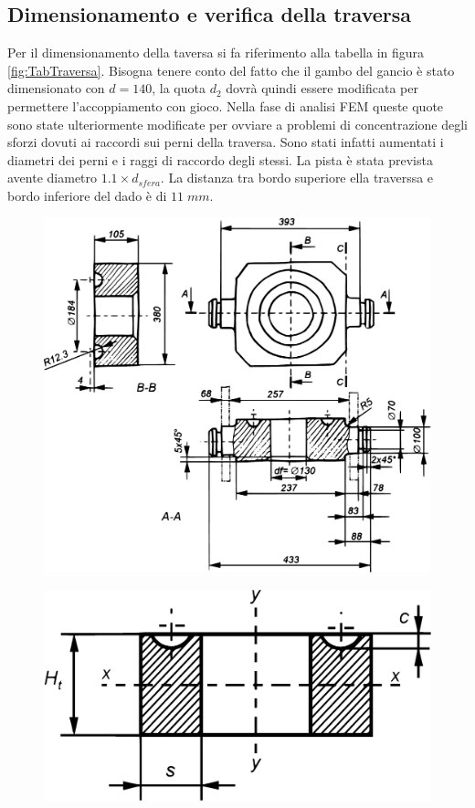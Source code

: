 \subsection{Dimensionamento e verifica della traversa}
Per il dimensionamento della taversa si fa riferimento alla tabella in figura \ref{fig:TabTraversa}.
Bisogna tenere conto del fatto che il gambo del gancio è stato dimensionato con $d=140$, la quota $d_2$ dovrà quindi essere modificata per permettere l'accoppiamento con gioco. Nella fase di analisi FEM queste quote sono state ulteriormente modificate per ovviare a problemi di concentrazione degli sforzi dovuti ai raccordi sui perni della traversa. 
Sono stati infatti aumentati i diametri dei perni e i raggi di raccordo degli stessi.
La pista è stata prevista avente diametro $1.1 \times d_{sfera}$.
La distanza tra bordo superiore ella traverssa e bordo inferiore del dado è di $11 \; mm$.
\begin{figure}[H]
\centering
\begin{minipage}{.5\textwidth}
  \centering
  \includegraphics[width=.8\linewidth]{imgs/Cap6/5 SchizzoTraversa}
  \label{fig:SchizzoTraversa}
\end{minipage}%
\begin{minipage}{.5\textwidth}
  \centering
  \includegraphics[width=.7\linewidth]{imgs/Cap6/7 SezResTrav}
  \label{fig:SezResTrav}
\end{minipage}
\end{figure}
